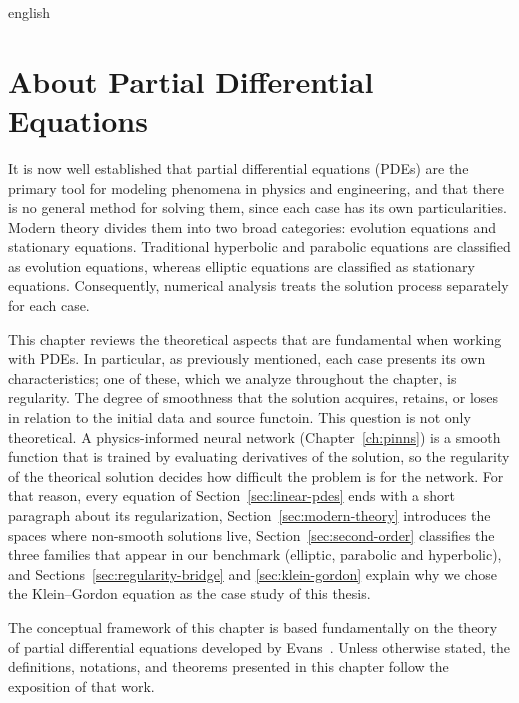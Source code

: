 
\begin{hyphenrules}{english}

\chapter{About Partial Differential Equations}\label{ch:pdes}

It is now well established that partial differential equations (PDEs) are the primary tool for
modeling phenomena in physics and engineering, and that there is no general method for solving them,
since each case has its own particularities. Modern theory divides them into two broad categories:
evolution equations and stationary equations. Traditional hyperbolic and parabolic equations are
classified as evolution equations, whereas elliptic equations are classified as stationary equations.
Consequently, numerical analysis treats the solution process separately for each case.

This chapter reviews the theoretical aspects that are fundamental when working with PDEs. In particular, as previously mentioned, each case presents its own characteristics; one of these, which we analyze throughout the chapter, is regularity. The degree of smoothness that the solution acquires, retains, or loses in relation to the initial data and source functoin. This question is not only theoretical. A physics-informed neural
network (Chapter~\ref{ch:pinns}) is a smooth function that is trained by evaluating derivatives of the
solution, so the regularity of the theorical solution decides how difficult the problem
is for the network. For that reason, every equation of Section~\ref{sec:linear-pdes} ends with a short
paragraph about its regularization, Section~\ref{sec:modern-theory} introduces the spaces where non-smooth
solutions live, Section~\ref{sec:second-order} classifies the three families that appear in our benchmark
(elliptic, parabolic and hyperbolic), and Sections~\ref{sec:regularity-bridge} and \ref{sec:klein-gordon} explain why we
chose the Klein--Gordon equation as the case study of this thesis.

The conceptual framework of this chapter is based fundamentally on the theory of partial differential
equations developed by Evans~\cite{evans2010}. Unless otherwise stated, the definitions, notations, and
theorems presented in this chapter follow the exposition of that work.


\end{hyphenrules}

